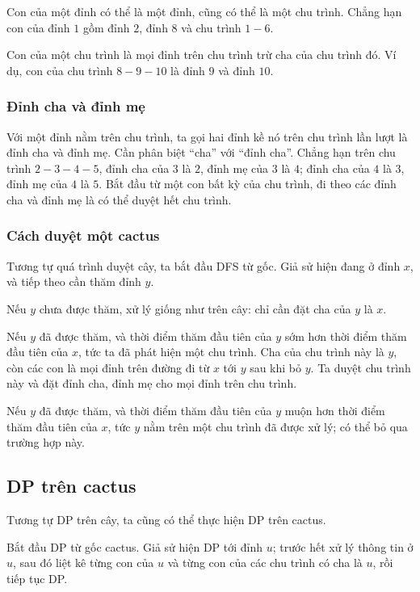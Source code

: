 \documentclass[11pt]{article}
\begin{document}
Con của một đỉnh có thể là một đỉnh, cũng có thể là một chu trình. Chẳng hạn
con của đỉnh \(1\) gồm đỉnh \(2\), đỉnh \(8\) và chu trình \(1-6\).

Con của một chu trình là mọi đỉnh trên chu trình trừ cha của chu trình đó. Ví
dụ, con của chu trình \(8-9-10\) là đỉnh \(9\) và đỉnh \(10\).

\subsubsection{Đỉnh cha và đỉnh mẹ}

Với một đỉnh nằm trên chu trình, ta gọi hai đỉnh kề nó trên chu trình lần lượt
là đỉnh cha và đỉnh mẹ. Cần phân biệt ``cha'' với ``đỉnh cha''. Chẳng hạn trên
chu trình \(2-3-4-5\), đỉnh cha của \(3\) là \(2\), đỉnh mẹ của \(3\) là \(4\);
đỉnh cha của \(4\) là \(3\), đỉnh mẹ của \(4\) là \(5\). Bắt đầu từ một con bất
kỳ của chu trình, đi theo các đỉnh cha và đỉnh mẹ là có thể duyệt hết chu
trình.

\subsubsection{Cách duyệt một cactus}

Tương tự quá trình duyệt cây, ta bắt đầu DFS từ gốc. Giả sử hiện đang ở đỉnh
\(x\), và tiếp theo cần thăm đỉnh \(y\).

Nếu \(y\) chưa được thăm, xử lý giống như trên cây: chỉ cần đặt cha của \(y\)
là \(x\).

Nếu \(y\) đã được thăm, và thời điểm thăm đầu tiên của \(y\) sớm hơn thời điểm
thăm đầu tiên của \(x\), tức ta đã phát hiện một chu trình. Cha của chu trình
này là \(y\), còn các con là mọi đỉnh trên đường đi từ \(x\) tới \(y\) sau khi
bỏ \(y\). Ta duyệt chu trình này và đặt đỉnh cha, đỉnh mẹ cho mọi đỉnh trên
chu trình.

Nếu \(y\) đã được thăm, và thời điểm thăm đầu tiên của \(y\) muộn hơn thời
điểm thăm đầu tiên của \(x\), tức \(y\) nằm trên một chu trình đã được xử lý;
có thể bỏ qua trường hợp này.

\subsection{DP trên cactus}

Tương tự DP trên cây, ta cũng có thể thực hiện DP trên cactus.

Bắt đầu DP từ gốc cactus. Giả sử hiện DP tới đỉnh \(u\); trước hết xử lý thông
tin ở \(u\), sau đó liệt kê từng con của \(u\) và từng con của các chu trình có
cha là \(u\), rồi tiếp tục DP.
\end{document}
